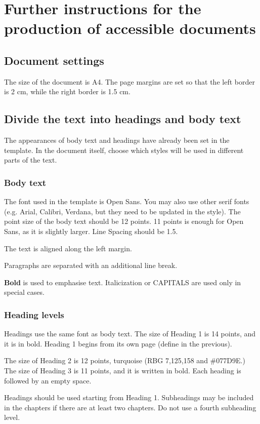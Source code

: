 \documentclass[11pt, a4paper]{report}
\begin{document}
\chapter{Further instructions for the production of accessible documents}

\section{Document settings}
The size of the document is A4. The page margins are set so that the left border is 2 cm, while the right border is 1.5 cm.

\section{Divide the text into headings and body text}
The appearances of body text and headings have already been set in the template. In the document itself, choose which styles will be used in different parts of the text.

\subsection{Body text}
The font used in the template is Open Sans. You may also use other serif fonts (e.g. Arial, Calibri, Verdana, but they need to be updated in the style). The point size of the body text should be 12 points. 11 points is enough for Open Sans, as it is slightly larger. Line Spacing should be 1.5.

The text is aligned along the left margin. 

Paragraphs are separated with an additional line break.

\textbf{Bold} is used to emphasise text. Italicization or CAPITALS are used only in special cases.

\subsection{Heading levels}
Headings use the same font as body text. The size of Heading 1 is 14 points, and it is in bold. Heading 1 begins from its own page (define in the previous).

The size of Heading 2 is 12 points, turquoise (RBG 7,125,158 and \#077D9E.) The size of Heading 3 is 11 points, and it is written in bold. Each heading is followed by an empty space.

Headings should be used starting from Heading 1. Subheadings may be included in the chapters if there are at least two chapters. Do not use a fourth subheading level.
\end{document}

